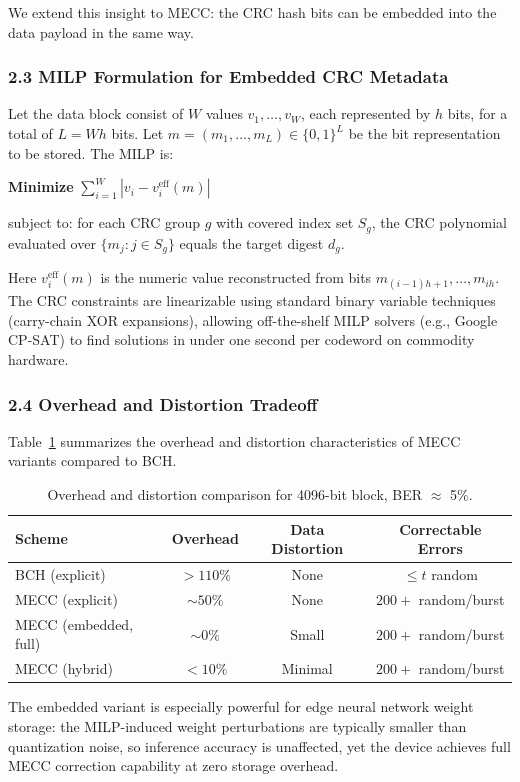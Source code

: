 We extend this insight to MECC: the CRC hash bits can be embedded into the data payload in the same way.

\subsubsection*{2.3 MILP Formulation for Embedded CRC Metadata}

Let the data block consist of $W$ values $v_1, \ldots, v_W$, each represented by $h$ bits, for a total of $L = Wh$ bits.
Let $m = (m_1, \ldots, m_L) \in \{0,1\}^L$ be the bit representation to be stored.
The MILP is:

\begin{center}
\textbf{Minimize} $\displaystyle\sum_{i=1}^{W} |v_i - v_i^{\text{eff}}(m)|$
\end{center}

subject to: for each CRC group $g$ with covered index set $S_g$, the CRC polynomial evaluated over $\{m_j : j \in S_g\}$ equals the target digest $d_g$.

Here $v_i^{\text{eff}}(m)$ is the numeric value reconstructed from bits $m_{(i-1)h+1}, \ldots, m_{ih}$.
The CRC constraints are linearizable using standard binary variable techniques (carry-chain XOR expansions), allowing off-the-shelf MILP solvers (e.g., Google CP-SAT) to find solutions in under one second per codeword on commodity hardware.

\subsubsection*{2.4 Overhead and Distortion Tradeoff}

Table~\ref{tab:overhead_comparison} summarizes the overhead and distortion characteristics of MECC variants compared to BCH.

\begin{table}[h]
\centering
\caption{Overhead and distortion comparison for 4096-bit block, BER $\approx$ 5\%.}
\label{tab:overhead_comparison}
\begin{tabular}{lccc}
\hline
\textbf{Scheme} & \textbf{Overhead} & \textbf{Data Distortion} & \textbf{Correctable Errors} \\
\hline
BCH (explicit)       & $> 110\%$  & None    & $\leq t$ random \\
MECC (explicit)      & $\sim 50\%$ & None    & $200+$ random/burst \\
MECC (embedded, full) & $\sim 0\%$  & Small   & $200+$ random/burst \\
MECC (hybrid)        & $< 10\%$    & Minimal & $200+$ random/burst \\
\hline
\end{tabular}
\end{table}

The embedded variant is especially powerful for edge neural network weight storage: the MILP-induced weight perturbations are typically smaller than quantization noise, so inference accuracy is unaffected, yet the device achieves full MECC correction capability at zero storage overhead.
